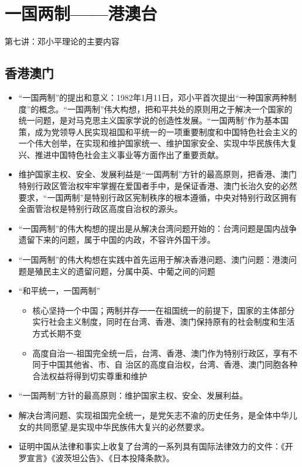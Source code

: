 \documentclass[
]{ctexart}
\providecommand{\tightlist}{%
  \setlength{\itemsep}{0pt}\setlength{\parskip}{0pt}}
\begin{document}
\hypertarget{ux4e00ux56fdux4e24ux5236ux6e2fux6fb3ux53f0}{%
\section{一国两制------港澳台}\label{ux4e00ux56fdux4e24ux5236ux6e2fux6fb3ux53f0}}

第七讲：邓小平理论的主要内容

\hypertarget{ux9999ux6e2fux6fb3ux95e8}{%
\subsection{香港澳门}\label{ux9999ux6e2fux6fb3ux95e8}}

\begin{itemize}
\tightlist
\item
  ``一国两制''的提出和意义：1982年1月11日，邓小平首次提出``一种国家两种制度''的概念。``一国两制''伟大构想，把和平共处的原则用之于解决一个国家的统一问题，是对马克思主义国家学说的创造性发展。``一国两制''作为基本国策，成为党领导人民实现祖国和平统一的一项重要制度和中国特色社会主义的一个伟大创举，在实现和维护国家统一、维护国家安全、实现中华民族伟大复兴、推进中国特色社会主义事业等方面作出了重要贡献。
\item
  维护国家主权、安全、发展利益是``一国两制''方针的最高原则，把香港、澳门特别行政区管治权牢牢掌握在爱国者手中，是保证香港、澳门长治久安的必然要求，``一国两制''是特别行政区宪制秩序的根本遵循，中央对特别行政区拥有全面管治权是特别行政区高度自治权的源头。
\item
  ``一国两制''的伟大构想的提出是从解决台湾问题开始的：台湾问题是国内战争遗留下来的问题，属于中国的内政，不容许外国干涉。
\item
  ``一国两制''的伟大构想在实践中首先运用于解决香港问题、澳门问题：港澳问题是殖民主义的遗留问题，分属中英、中葡之间的问题
\item
  ``和平统一，一国两制''

  \begin{itemize}
  \tightlist
  \item
    核心坚持一个中国；两制并存一一在祖国统一的前提下，国家的主体部分实行社会主义制度，同时在台湾、香港、澳门保持原有的社会制度和生活方式长期不变
  \item
    高度自治一-祖国完全统一后，台湾、香港、澳门作为特别行政区，享有不同于中国其他省、市、自
    治区的高度自治权，台湾、香港、澳门同胞各种合法权益将得到切实尊重和维护
  \end{itemize}
\item
  ``一国两制''方针的最高原则：维护国家主权、安全、发展利益。
\item
  解决台湾问题、实现祖国完全统一，是党矢志不渝的历史任务，是全体中华儿女的共同愿望,是实现中华民族伟大复兴的必然要求。
\item
  证明中国从法律和事实上收复了台湾的一系列具有国际法律效力的文件：《开罗宣言》《波茨坦公告》、《日本投降条款》。
\end{itemize}
\end{document}

